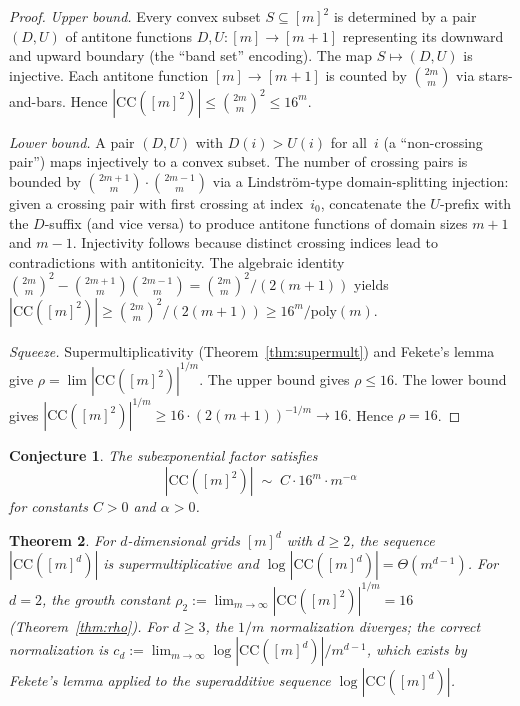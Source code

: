 \documentclass[11pt,a4paper]{article}
\theoremstyle{plain}
\newtheorem{theorem}{Theorem}[section]
\newtheorem{conjecture}[theorem]{Conjecture}
\theoremstyle{definition}
\theoremstyle{remark}
\newcommand{\CC}{\mathrm{CC}}
\begin{document}
\begin{proof}
\emph{Upper bound.}
Every convex subset $S \subseteq [m]^2$ is determined by a pair
$(D, U)$ of antitone functions $D, U \colon [m] \to [m{+}1]$
representing its downward and upward boundary (the ``band set''
encoding). The map $S \mapsto (D, U)$ is injective.
Each antitone function $[m] \to [m{+}1]$ is counted by
$\binom{2m}{m}$ via stars-and-bars.
Hence $|\CC([m]^2)| \leq \binom{2m}{m}^2 \leq 16^m$.

\emph{Lower bound.}
A pair $(D, U)$ with $D(i) > U(i)$ for all~$i$ (a ``non-crossing
pair'') maps injectively to a convex subset. The number of crossing
pairs is bounded by $\binom{2m+1}{m} \cdot \binom{2m-1}{m}$
via a Lindstr\"om-type domain-splitting injection: given a crossing
pair with first crossing at index~$i_0$, concatenate the
$U$-prefix with the $D$-suffix (and vice versa) to produce antitone
functions of domain sizes $m+1$ and $m-1$. Injectivity follows
because distinct crossing indices lead to contradictions with
antitonicity. The algebraic identity
$\binom{2m}{m}^2 - \binom{2m+1}{m}\binom{2m-1}{m} =
\binom{2m}{m}^2\!/(2(m{+}1))$
yields $|\CC([m]^2)| \geq \binom{2m}{m}^2\!/(2(m{+}1))
\geq 16^m / \mathrm{poly}(m)$.

\emph{Squeeze.}
Supermultiplicativity (Theorem~\ref{thm:supermult}) and Fekete's
lemma give $\rho = \lim |\CC([m]^2)|^{1/m}$.
The upper bound gives $\rho \leq 16$.
The lower bound gives $|\CC([m]^2)|^{1/m} \geq
16 \cdot (2(m{+}1))^{-1/m} \to 16$.
Hence $\rho = 16$.
\end{proof}

\begin{conjecture}\label{conj:subexp}
The subexponential factor satisfies
\[
|\CC([m]^2)| \;\sim\; C \cdot 16^m \cdot m^{-\alpha}
\]
for constants $C > 0$ and $\alpha > 0$.
\end{conjecture}

\begin{theorem}\label{thm:dimension}
For $d$-dimensional grids $[m]^d$ with $d \geq 2$, the sequence $|\CC([m]^d)|$ is supermultiplicative and $\log|\CC([m]^d)| = \Theta(m^{d-1})$.
For $d = 2$, the growth constant $\rho_2 := \lim_{m \to \infty} |\CC([m]^2)|^{1/m} = 16$ (Theorem~\ref{thm:rho}).
For $d \geq 3$, the $1/m$ normalization diverges; the correct normalization is $c_d := \lim_{m \to \infty} \log|\CC([m]^d)| / m^{d-1}$, which exists by Fekete's lemma applied to the superadditive sequence $\log|\CC([m]^d)|$.
\end{theorem}
\end{document}
